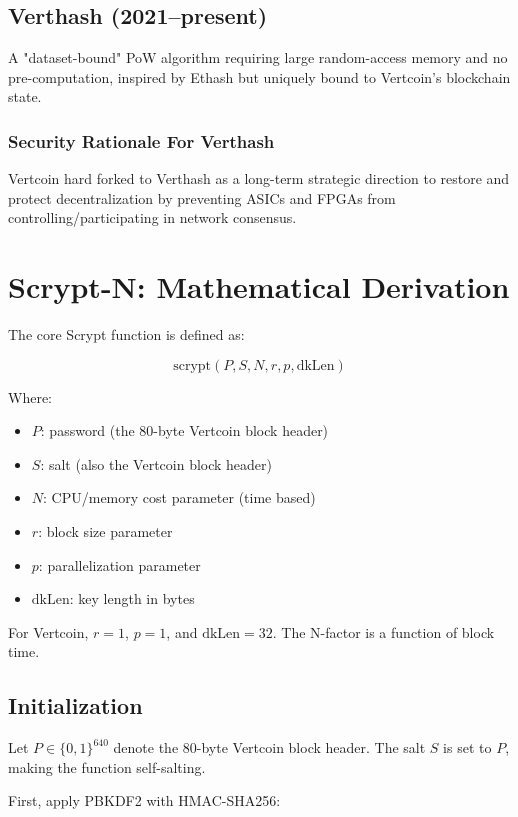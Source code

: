 \documentclass[12pt]{article}
\begin{document}
\subsection{Verthash (2021--present)}
A "dataset-bound" PoW algorithm requiring large random-access memory and no pre-computation, inspired by Ethash but uniquely bound to Vertcoin’s blockchain state.

\subsubsection{Security Rationale For Verthash}
Vertcoin hard forked to Verthash as a long-term strategic direction to restore and protect decentralization by preventing ASICs and FPGAs from controlling/participating in network consensus. 

\newpage
\section{Scrypt-N: Mathematical Derivation}

The core Scrypt function is defined as:

\[
\text{scrypt}(P, S, N, r, p, \text{dkLen})
\]

Where:
\begin{itemize}
    \item \( P \): password (the 80-byte Vertcoin block header)
    \item \( S \): salt (also the Vertcoin block header)
    \item \( N \): CPU/memory cost parameter (time based)
    \item \( r \): block size parameter
    \item \( p \): parallelization parameter
    \item \( \text{dkLen} \): key length in bytes
\end{itemize}

For Vertcoin, \( r = 1 \), \( p = 1 \), and \( \text{dkLen} = 32 \). The N-factor is a function of block time.

\subsection{Initialization}

Let \( P \in \{0,1\}^{640} \) denote the 80-byte Vertcoin block header. The salt \( S \) is set to \( P \), making the function self-salting.

First, apply PBKDF2 with HMAC-SHA256:
\end{document}
